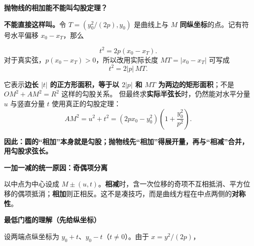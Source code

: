 \begin{explanationbox}
\par\medskip
\begin{minipage}{\linewidth}
\noindent
\textbf{\textcolor{CExplanation}{抛物线的相加能不能叫勾股定理？}}\par\nobreak\smallskip
\par\noindent\textbf{不能直接这样叫。}令 $T=(y_0^2/(2p),y_0)$ 是曲线上与 $M$ \textbf{同纵坐标}的点。记有符号水平偏移 $x_0-x_T$，那么\par
\end{minipage}
\par

\[
\boxed{t^2=2p(x_0-x_T)}.
\]
对于真实弦，$p(x_0-x_T)>0$，所以改用实际长度 $MT=|x_0-x_T|$ 可写成
\[
\boxed{t^2=2|p|\,MT}.
\]

\par
\begin{minipage}{\linewidth}
\begin{center}

\end{center}
\end{minipage}
\par

它表示\textbf{边长 $|t|$ 的正方形面积，等于以 $2|p|$ 和 $MT$ 为两边的矩形面积}；不是 $OM^2+AM^2=R^2$ 这样的勾股关系。
但最终求\textbf{实际半弦长}时，仍然能对水平分量 $u$ 与竖直分量 $t$ 使用真正的勾股定理：
\[
\boxed{AM^2=u^2+t^2
 =(2px_0-y_0^2)\!\left(1+\frac{y_0^2}{p^2}\right)}.
\]
\par\noindent\textbf{因此：圆的“相加”本身就是勾股；抛物线先“相加”得展开量，再与“相减”合并，用勾股求弦长。}
\par\medskip
\begin{minipage}{\linewidth}
\noindent
\textbf{\textcolor{CExplanation}{一加一减的统一原因：奇偶项分离}}\par\nobreak\smallskip
以中点为中心设成 $M\pm(u,t)$。\textbf{相减}时，含一次位移的奇项不互相抵消、平方位移的偶项抵消；\textbf{相加}则正相反。这不是凑技巧，而是曲线方程在中点两侧的\textbf{对称性}。\par
\end{minipage}
\par

\par\medskip
\begin{minipage}{\linewidth}
\noindent
\textbf{\textcolor{CExplanation}{最低门槛的理解（先给纵坐标）}}\par\nobreak\smallskip
设两端点纵坐标为 $y_0+t$、$y_0-t$（$t\ne0$）。由于 $x=y^2/(2p)$，\par
\end{minipage}
\par


\end{explanationbox}
